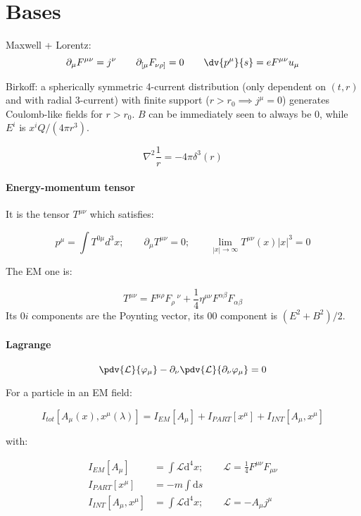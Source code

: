 \section{Bases}

Maxwell + Lorentz:
\[
\partial _\mu F^{\mu \nu} = j^\nu \qquad
\partial _{[\mu} F_{\nu \rho ]} = 0 \qquad 
\dv{p^\mu}{s} = e F^{\mu \nu} u_\mu
\]

Birkoff: a spherically symmetric 4-current distribution (only dependent on $(t, r)$ and with radial 3-current) with finite support ($r>r_0 \implies j^\mu = 0$) generates Coulomb-like fields for $r>r_0$. $B$ can be immediately seen to always be 0, while $E^i$ is $x^i Q / (4\pi r^3)$. 

\[
\nabla^2 \frac{1}{r} = -4\pi \delta^3 (r)
\]


\paragraph{Energy-momentum tensor}

It is the tensor $T^{\mu \nu}$ which satisfies:

\begin{equation}
p^{\mu} = \int T^{0\mu} d^3 x;
\qquad
\partial_\mu T^{\mu \nu} = 0;
\qquad
\lim_{|x| \rightarrow \infty} T^{\mu \nu} (x) |x|^3 = 0
\end{equation}

The EM one is:

\[
T^{\mu \nu} = F^{\mu \rho} F_\rho\, ^\nu + \frac{1}{4} \eta ^{\mu \nu} F^{\alpha \beta} F_{\alpha \beta} 
\]
Its $0i$ components are the Poynting vector, its $00$ component is $(E^2 + B^2)/2$.

\paragraph{Lagrange}

\begin{equation}
\pdv{\mathcal{L}}{\varphi_\mu}  
-\partial_\nu \pdv{\mathcal{L}}{\partial_\nu \varphi_\mu}
= 0
\end{equation}

For a particle in an EM field:

\begin{equation}
    I_{tot} [A_\mu (x), x^\mu (\lambda)] =
    I_{EM} [A_\mu] + I_{PART} [x^\mu] + I_{INT} [A_\mu , x^\mu]
\end{equation}

with:

\begin{align}
    I_{EM} [A_\mu] &= \int \mathcal{L} \mathrm{d}^4x; \qquad \mathcal{L} = \frac{1}{4} F^{\mu \nu} F_{\mu \nu} \\
    I_{PART} [x^\mu] &= -m \int \mathrm{d}s \\
    I_{INT} [A_\mu , x^\mu] &= \int \mathcal{L} \mathrm{d}^4x; \qquad \mathcal{L} =
    - A_\mu j^\mu
\end{align}

